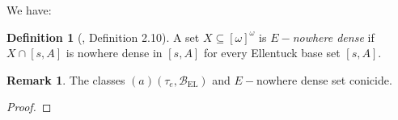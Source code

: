 \documentclass[12pt]{amsart}
\theoremstyle{plain}
\theoremstyle{definition}
\newtheorem{definition}[theorem]{Definition}
\newtheorem{remark}[theorem]{Remark}
\theoremstyle{remark}
\newcommand{\infsub}{[\omega]^{\omega}}
\newcommand{\cB}{{\mathcal B}}
\newcommand{\aideal}{\mathit{(a)}}
\newcommand{\baseEllentuck}{\cB_{\mathrm{EL}}}
\begin{document}
We have:
\begin{definition}[\cite{Corazza1992}, Definition 2.10]
  A set $X \subseteq\infsub$ is {\it $E-$nowhere dense}
if $X \cap [s,A]$ is nowhere dense in $[s,A]$
for every Ellentuck base set $[s, A]$.
\end{definition}

\begin{remark}
  The classes $\aideal(\tau_e, \baseEllentuck)$ and
  $E-$nowhere dense set conicide.
\end{remark}
\begin{proof}
\end{proof}

\printbibliography
\end{document}

